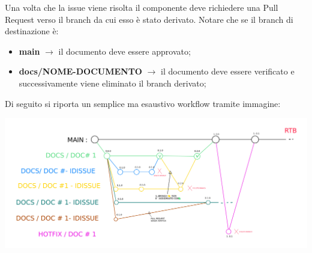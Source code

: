         Una volta che la issue viene risolta il componente deve richiedere una Pull Request
        verso il branch da cui esso è stato derivato.
        Notare che se il branch di destinazione è:
        \begin{itemize}
            \item \textbf{main} $\rightarrow$ il documento deve essere approvato;
            \item \textbf{docs/NOME-DOCUMENTO} $\rightarrow$ il documento deve essere verificato e successivamente viene eliminato il branch derivato;
        \end{itemize}

        Di seguito si riporta un semplice ma esaustivo workflow tramite immagine:
        \begin{center}
            \includegraphics[scale = 0.07]{template/images/workflow.jpg}
        \end{center}

